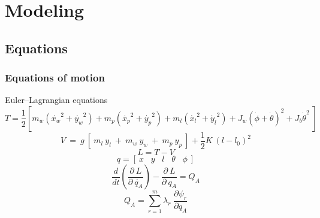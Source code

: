 \section{Modeling}

\subsection*{Equations}

\begin{frame}
\frametitle{Equations of motion}

\begin{block}{Euler--Lagrangian equations}
\begin{equation*}
 T =\frac{1}{2}\left[m_w(\dot{x_w}^2 + \dot{y_w}^2) + m_p (\dot{x_p}^2 + \dot{y_p}^2)
  + m_l(\dot{x_l}^2 + \dot{y_l}^2) +  J_w(\dot{\phi} + \dot{\theta})^2
  + J_b\dot{\theta}^2\;\right]
\end{equation*}
\vspace{2mm}
\begin{equation*}
V\:=\: g\:\left[\: m_l\:y_l\:+\: m_w\:y_w\:+\: m_p\:y_p\:\right] + \frac{1}{2}K\:(l - l_0)^2
\end{equation*}
\vspace{2mm}
\begin{equation*}
L = T - V
\end{equation*}
\vspace{2mm}
\begin{equation*}
q = \left[\:x\;\;\;y\;\;\;l\;\;\;\theta\;\;\;\phi\:\right] 
\end{equation*}
\vspace{2mm}
\begin{equation*}
\frac{d}{dt}\left(\frac{\partial\:L}{\partial\:\dot{q_A}}\right) - \frac{\partial\:L}{\partial\:q_A} = Q_A
\end{equation*}
\vspace{2mm}
\begin{equation*}
 Q_A = \sum_{r=1}^m\lambda_r\;\frac{\partial \psi_r}{\partial q_A}
\end{equation*}

\end{block}
\end{frame}

